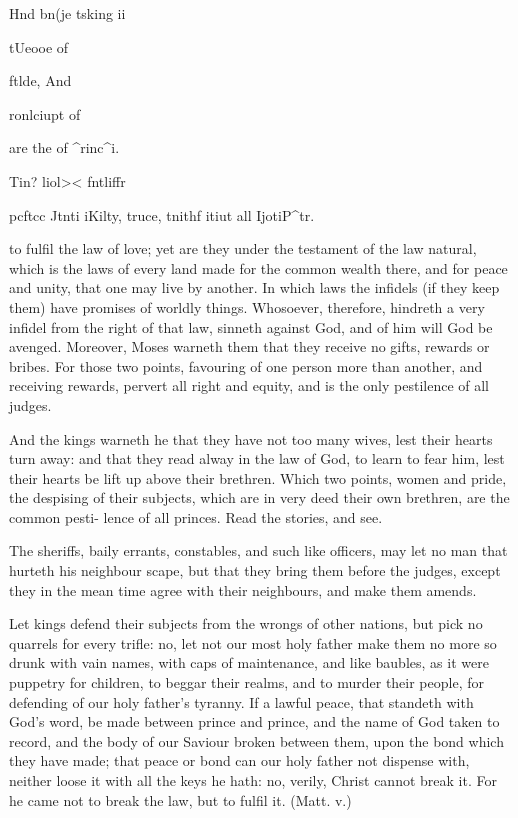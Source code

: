 \documentclass{custom}
\begin{document}
{Hnd bn(je 
tsking ii 

tUeooe of 

ftlde, And 

ronlciupt of 

are the 
of ^rinc^i. 

Tin? liol>< 
fntliffr 

pcftcc Jtnti 
iKilty, 
truce, 
tnithf itiut 
all IjotiP^tr. 

to fulfil the law of love; yet are they under the testament 
of the law natural, which is the laws of every land made 
for the common wealth there, and for peace and unity, 
that one may live by another. In which laws the infidels 
(if they keep them) have promises of worldly things. 
Whosoever, therefore, hindreth a very infidel from the 
right of that law, sinneth against God, and of him will 
God be avenged. Moreover, Moses warneth them that 
they receive no gifts, rewards or bribes. For those two 
points, favouring of one person more than another, and 
receiving rewards, pervert all right and equity, and is the 
only pestilence of all judges. 

And the kings warneth he that they have not too many 
wives, lest their hearts turn away: and that they read 
alway in the law of God, to learn to fear him, lest their 
hearts be lift up above their brethren. Which two points, 
women and pride, the despising of their subjects, which 
are in very deed their own brethren, are the common pesti- 
lence of all princes. Read the stories, and see. 

The sheriffs, baily errants, constables, and such like officers, 
may let no man that hurteth his neighbour scape, but that 
they bring them before the judges, except they in the mean 
time agree with their neighbours, and make them amends. 

Let kings defend their subjects from the wrongs of other 
nations, but pick no quarrels for every trifle: no, let not 
our most holy father make them no more so drunk with 
vain names, with caps of maintenance, and like baubles, 
as it were puppetry for children, to beggar their realms, 
and to murder their people, for defending of our holy 
father's tyranny. If a lawful peace, that standeth with 
God's word, be made between prince and prince, and 
the name of God taken to record, and the body of our 
Saviour broken between them, upon the bond which they 
have made; that peace or bond can our holy father not 
dispense with, neither loose it with all the keys he hath:
no, verily, Christ cannot break it. For he came not to 
break the law, but to fulfil it. (Matt. v.) 

}
\end{document}
